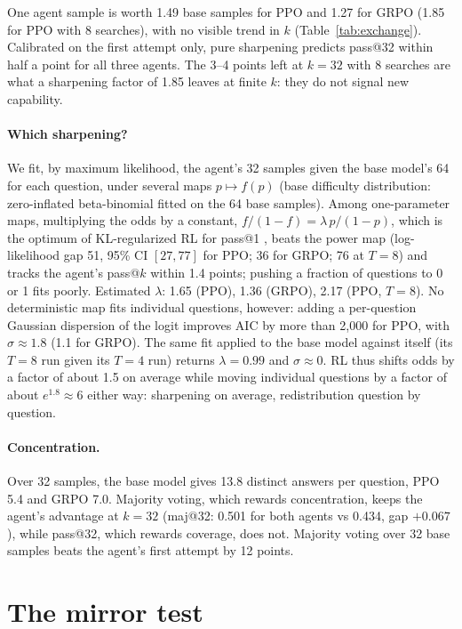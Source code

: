 \documentclass[11pt]{article}
\begin{document}
One agent sample is worth 1.49 base samples for PPO and 1.27 for GRPO (1.85 for PPO with 8 searches), with no visible trend in $k$ (Table~\ref{tab:exchange}). Calibrated on the first attempt only, pure sharpening predicts pass@32 within half a point for all three agents. The 3--4 points left at $k = 32$ with 8 searches are what a sharpening factor of 1.85 leaves at finite $k$: they do not signal new capability.

\paragraph{Which sharpening?} We fit, by maximum likelihood, the agent's 32 samples given the base model's 64 for each question, under several maps $p \mapsto f(p)$ (base difficulty distribution: zero-inflated beta-binomial fitted on the 64 base samples). Among one-parameter maps, multiplying the odds by a constant, $f/(1-f) = \lambda\, p/(1-p)$, which is the optimum of KL-regularized RL for pass@1 \citep[App.~B]{matrenok2026controlling}, beats the power map (log-likelihood gap 51, 95\% CI $[27, 77]$ for PPO; 36 for GRPO; 76 at $T = 8$) and tracks the agent's pass@$k$ within 1.4 points; pushing a fraction of questions to 0 or 1 \citep[Thm.~2]{oh2026sharpening} fits poorly. Estimated $\lambda$: 1.65 (PPO), 1.36 (GRPO), 2.17 (PPO, $T = 8$). No deterministic map fits individual questions, however: adding a per-question Gaussian dispersion of the logit improves AIC by more than 2{,}000 for PPO, with $\sigma \approx 1.8$ (1.1 for GRPO). The same fit applied to the base model against itself (its $T = 8$ run given its $T = 4$ run) returns $\lambda = 0.99$ and $\sigma \approx 0$. RL thus shifts odds by a factor of about 1.5 on average while moving individual questions by a factor of about $e^{1.8} \approx 6$ either way: sharpening on average, redistribution question by question.

\paragraph{Concentration.} Over 32 samples, the base model gives 13.8 distinct answers per question, PPO 5.4 and GRPO 7.0. Majority voting, which rewards concentration, keeps the agent's advantage at $k = 32$ (maj@32: 0.501 for both agents vs 0.434, gap $+0.067$), while pass@32, which rewards coverage, does not. Majority voting over 32 base samples beats the agent's first attempt by 12 points.

\section{The mirror test}\label{sec:mirror}
\end{document}
